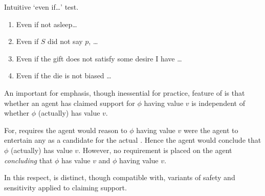 \begin{note}
  \color{red}
  Intuitive `even if\dots' test.

  \begin{enumerate}[label=\ref{fig:ideaCSA:basic-examples}\alph*., ref=(\ref{fig:ideaCSA:basic-examples}\alph*)]
  \item Even if not asleep\dots
  \item Even if \(S\) did not say \(p\), \dots
  \item Even if the gift does not satisfy some desire I have \dots
  \item Even if the die is not biased \dots
  \end{enumerate}
\end{note}

\begin{note}
  An important for emphasis, though inessential for practice, feature of \ideaCSA{} is that whether an agent has claimed support for \(\phi\) having value \(v\) is independent of whether \(\phi\) (actually) has value \(v\).

  For, \ideaCSA{} requires the agent would reason to \(\phi\) having value \(v\) were the agent to entertain any \epPAd{} \world{} as a candidate for the actual \world{}.
  Hence the agent would conclude that \(\phi\) (actually) has value \(v\).
  However, no requirement is placed on the agent \emph{concluding} that \(\phi\) has value \(v\) and \(\phi\) having value \(v\).

  In this respect, \ideaCSA{} is distinct, though compatible with, variants of safety and sensitivity applied to claiming support.
\end{note}

